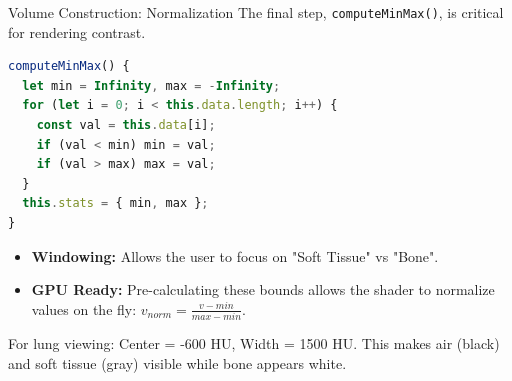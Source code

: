 \begin{frame}[fragile]{Volume Construction: Normalization}
The final step, \texttt{computeMinMax()}, is critical for rendering contrast.

\begin{lstlisting}[language=JavaScript]
computeMinMax() {
  let min = Infinity, max = -Infinity;
  for (let i = 0; i < this.data.length; i++) {
    const val = this.data[i];
    if (val < min) min = val;
    if (val > max) max = val;
  }
  this.stats = { min, max };
}
\end{lstlisting}

\begin{itemize}
    \item \textbf{Windowing:} Allows the user to focus on "Soft Tissue" vs "Bone".
    \item \textbf{GPU Ready:} Pre-calculating these bounds allows the shader to normalize values on the fly: $v_{norm} = \frac{v - min}{max - min}$.
\end{itemize}

For lung viewing: Center = -600 HU, Width = 1500 HU. This makes air (black) and soft tissue (gray) visible while bone appears white.
\end{frame}

